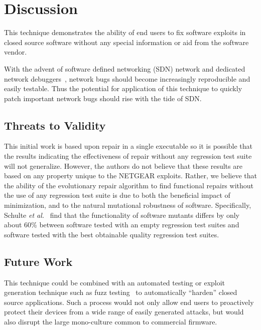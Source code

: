 \documentclass{sigcomm-alternate}
\begin{document}
\section{Discussion}
This technique demonstrates the ability of end users to fix software
exploits in closed source software without any special information or
aid from the software vendor.


With the advent of software defined networking (SDN) network and
dedicated network debuggers~\cite{handigol2012debugger}, network bugs
should become increasingly reproducible and easily testable.  Thus the
potential for application of this technique to quickly patch important
network bugs should rise with the tide of SDN.

\subsection{Threats to Validity}
This initial work is based upon repair in a single executable so it is
possible that the results indicating the effectiveness of repair
without any regression test suite will not generalize.  However, the
authors do not believe that these results are based on any property
unique to the NETGEAR exploits. Rather, we believe that the ability of
the evolutionary repair algorithm to find functional repairs without
the use of any regression test suite is due to both the beneficial
impact of minimization, and to the natural mutational robustness of
software. Specifically, Schulte \emph{et al.}~\cite{schulte2013software} 
find that the functionality of software mutants differs by only about 60\%
between software tested with an empty regression test suites and software
tested with the best obtainable quality regression test suites.

\subsection{Future Work}

This technique could be combined with an automated testing or exploit
generation technique such as fuzz testing~\cite{miller1990empirical}
to automatically ``harden'' closed source applications.  Such a
process would not only allow end users to proactively protect their
devices from a wide range of easily generated attacks, but would also
disrupt the large mono-culture common to commercial firmware.
\end{document}
